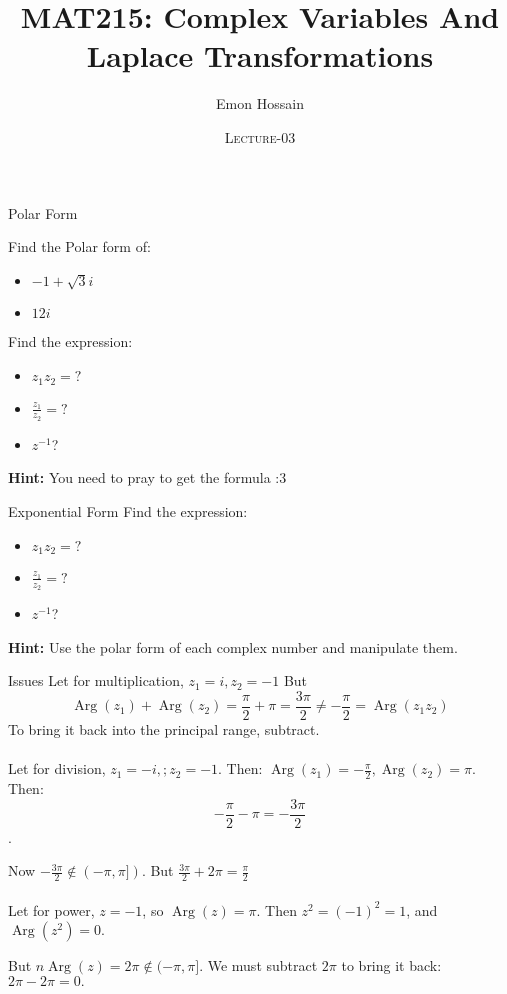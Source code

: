 \documentclass[11pt]{beamer}
\author[] %
{Emon Hossain\inst{1}}
\institute[University of Dhaka] %
{
  \inst{1}%
  Lecturer\\MNS department\\Brac University
}
\date[] %
{\textsc{Lecture-03}}
\title[]{MAT215: Complex Variables And Laplace Transformations}
\theoremstyle{plain}
\begin{document}
\begin{frame}
\titlepage
\end{frame}

\begin{frame}{Polar Form}
    \begin{problem}
        Find the Polar form of:
        \begin{itemize}
            \item $-1+\sqrt 3 i$
            \item $12i$
        \end{itemize}
    \end{problem}
    Find the expression:
    \begin{itemize}
        \item $z_1 z_2=?$
        \item $\frac{z_1}{z_2}=?$
        \item $z^{-1}$?
    \end{itemize}
    \textbf{Hint:} You need to pray to get the formula :3
\end{frame}

\begin{frame}{Exponential Form}
    Find the expression:
    \begin{itemize}
        \item $z_1 z_2=?$
        \item $\frac{z_1}{z_2}=?$
        \item $z^{-1}$?
    \end{itemize}
    \textbf{Hint:} Use the polar form of each complex number and manipulate them.
\end{frame}

\begin{frame}{Issues}
Let for multiplication, $z_1=i, z_2=-1$
But
$$\operatorname{Arg}(z_1)+\operatorname{Arg}(z_2)=\frac\pi2+\pi=\frac{3\pi}{2}\neq -\frac\pi2=\operatorname{Arg}(z_1 z_2)$$
To bring it back into the principal range, subtract.
\\~\\
Let for division, $z_1 = -i, ; z_2 = -1$. Then:
$
\operatorname{Arg}(z_1) = -\frac{\pi}{2},\operatorname{Arg}(z_2) = \pi.
$
Then:$$-\frac{\pi}{2} - \pi = -\frac{3\pi}{2}$$.

Now $-\frac{3\pi}{2} \notin (-\pi, \pi] )$. But $\frac{3\pi}{2} + 2\pi = \frac{\pi}{2}$\\~\\
Let for power, $z = -1$, so $\operatorname{Arg}(z) = \pi.$ Then $z^2 = (-1)^2 = 1$, and $\operatorname{Arg}(z^2) = 0$.

But $n\operatorname{Arg}(z) = 2\pi \notin (-\pi, \pi]$. We must subtract $2\pi$ to bring it back: $2\pi - 2\pi = 0.$
\end{frame}
\end{document}
